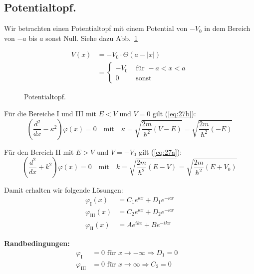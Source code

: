 \subsection{Potentialtopf.}
Wir betrachten einen Potentialtopf mit einem Potential von $-V_0$ in dem
Bereich von $-a$ bis $a$ sonst Null. Siehe dazu Abb.~\ref{fig:7}
  
\begin{figure}[htbp]
  \begin{minipage}[h]{0.45\linewidth}
    \begin{align*}
      V(x)&=-V_0\cdot\Theta\left(a-|x|\right) \\
      &= \begin{cases}
        -V_0 & \mbox{ für }-a<x<a\\
        0 & \mbox{ sonst}
      \end{cases}
    \end{align*}
    \vspace{1cm}
  \end{minipage}
  \hfill
  \begin{minipage}[h]{0.5\linewidth}
    
  \end{minipage}
  \caption{Potentialtopf.}
  \label{fig:7}
\end{figure}

Für die Bereiche I und III mit $E < V$ und $V=0$ gilt (\ref{eq:27b}):
\begin{equation}
  \left(\frac{d^2}{dx}-\kappa^2\right)\varphi(x)=0
   \quad\text{mit} \quad
  \kappa=\sqrt{\frac{2m}{\hbar^2}(V-E)}
      =\sqrt{\frac{2m}{\hbar^2}(-E)}\label{eq:56}
\end{equation}

Für den Bereich II mit $E > V$ und $V=-V_0$ gilt (\ref{eq:27a}):
\begin{equation}
  \left(\frac{d^2}{dx}+k^2\right)\varphi(x)=0
  \quad \text{mit} \quad
  k=\sqrt{\frac{2m}{\hbar^2}(E-V)}
   =\sqrt{\frac{2m}{\hbar^2}(E+V_0)}\label{eq:57}
\end{equation}

Damit erhalten wir folgende Lösungen:
\begin{align*}
  \varphi_\text{I}(x)&= C_1 e^{\kappa x}+D_1 e^{-\kappa x} \\
  \varphi_\text{III}(x)&= C_2 e^{\kappa x}+D_2 e^{-\kappa x}\\
   \varphi_\text{II}(x)&= A e^{i k x}+B e^{-i k x}
\end{align*}

\textbf{Randbedingungen:}
\begin{align*}
  \varphi_\text{I} &= 0 \text{ für } x \rightarrow -\infty \Rightarrow D_1=0&\\
  \varphi_\text{III} &= 0 \text{ für } x \rightarrow \infty \Rightarrow C_2=0&\\
\end{align*}

